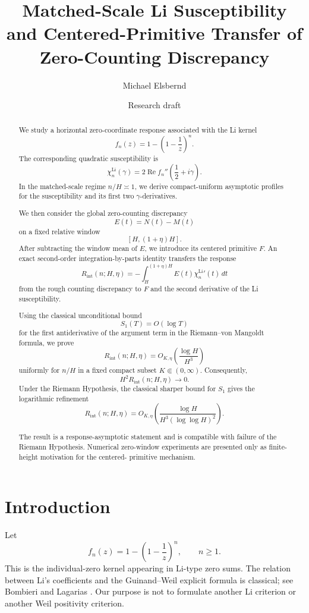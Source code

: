 \documentclass[11pt]{article}
\title{
Matched-Scale Li Susceptibility and Centered-Primitive Transfer
of Zero-Counting Discrepancy
}
\author{Michael Elsbernd}
\date{Research draft}
\newcommand{\LiSus}{\chi^{\mathrm{Li}}}
\newcommand{\Rint}{R_{\mathrm{int}}}
\begin{document}
\maketitle

\begin{abstract}
We study a horizontal zero-coordinate response associated with the
Li kernel
\[
f_n(z)
=
1-
\left(
1-\frac1z
\right)^n.
\]
The corresponding quadratic susceptibility is
\[
\LiSus_n(\gamma)
=
2\operatorname{Re}
f_n''
\left(
\frac12+i\gamma
\right).
\]
In the matched-scale regime \(n/H\asymp1\), we derive compact-uniform
asymptotic profiles for the susceptibility and its first two
\(\gamma\)-derivatives.

We then consider the global zero-counting discrepancy
\[
E(t)=N(t)-M(t)
\]
on a fixed relative window
\[
[H,(1+\eta)H].
\]
After subtracting the window mean of \(E\), we introduce its centered
primitive \(F\). An exact second-order integration-by-parts identity
transfers the response
\[
\Rint(n;H,\eta)
=
-
\int_H^{(1+\eta)H}
E(t)\LiSus_n'(t)\,dt
\]
from the rough counting discrepancy to \(F\) and the second derivative
of the Li susceptibility.

Using the classical unconditional bound
\[
S_1(T)=O(\log T)
\]
for the first antiderivative of the argument term in the
Riemann--von Mangoldt formula, we prove
\[
\Rint(n;H,\eta)
=
O_{K,\eta}
\left(
\frac{\log H}{H^3}
\right)
\]
uniformly for \(n/H\) in a fixed compact subset
\(K\Subset(0,\infty)\). Consequently,
\[
H^2\Rint(n;H,\eta)\to0.
\]
Under the Riemann Hypothesis, the classical sharper bound for
\(S_1\) gives the logarithmic refinement
\[
\Rint(n;H,\eta)
=
O_{K,\eta}
\left(
\frac{\log H}
{H^3(\log\log H)^2}
\right).
\]

The result is a response-asymptotic statement and is compatible with
failure of the Riemann Hypothesis. Numerical zero-window experiments
are presented only as finite-height motivation for the centered-
primitive mechanism.
\end{abstract}

\section{Introduction}

Let
\[
f_n(z)
=
1-
\left(
1-\frac1z
\right)^n,
\qquad n\ge1.
\]
This is the individual-zero kernel appearing in Li-type zero sums.
The relation between Li's coefficients and the Guinand--Weil explicit
formula is classical; see Bombieri and Lagarias
\cite{BombieriLagarias1999}. Our purpose is not to formulate another
Li criterion or another Weil positivity criterion.
\end{document}
